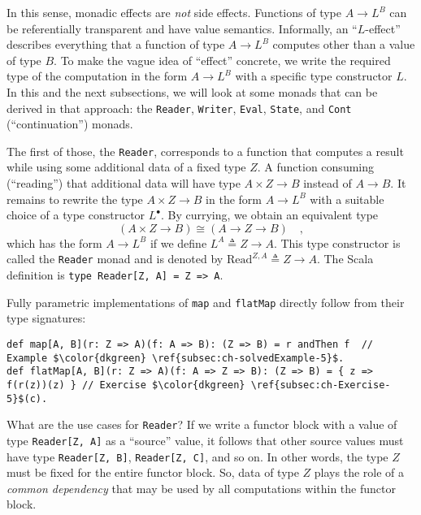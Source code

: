 In this sense, monadic effects are \emph{not} side effects.
Functions of type $A\rightarrow L^{B}$ can be referentially transparent
and have value semantics. Informally, an \textsf{``}$L$-effect\textsf{''}
describes everything that a function of type $A\rightarrow L^{B}$
computes other than a value of type $B$. To make the vague idea of
\textsf{``}effect\textsf{''} concrete, we write the required type of the computation
in the form $A\rightarrow L^{B}$ with a specific type constructor
$L$. In this and the next subsections, we will look at some monads
that can be derived in that approach: the \lstinline!Reader!, \lstinline!Writer!,
\lstinline!Eval!, \lstinline!State!, and \lstinline!Cont! (\textsf{``}continuation\textsf{''})
monads.

The first of those, the \lstinline!Reader!, corresponds to a function
that computes a result while using some additional data of a fixed
type $Z$. A function consuming (\textsf{``}reading\textsf{''}) that additional data
will have type $A\times Z\rightarrow B$ instead of $A\rightarrow B$.
It remains to rewrite the type $A\times Z\rightarrow B$ in the form
$A\rightarrow L^{B}$ with a suitable choice of a type constructor
$L^{\bullet}$. By currying, we obtain an equivalent type
\[
(A\times Z\rightarrow B)\cong(A\rightarrow Z\rightarrow B)\quad,
\]
which has the form $A\rightarrow L^{B}$ if we define $L^{A}\triangleq Z\rightarrow A$.
This type constructor is called the \lstinline!Reader! monad
and is denoted by $\text{Read}^{Z,A}\triangleq Z\rightarrow A$. The
Scala definition is \lstinline!type Reader[Z, A] = Z => A!.

Fully parametric implementations of \lstinline!map! and \lstinline!flatMap!
directly follow from their type signatures:
\begin{lstlisting}[mathescape=true]
def map[A, B](r: Z => A)(f: A => B): (Z => B) = r andThen f  // Example $\color{dkgreen} \ref{subsec:ch-solvedExample-5}$.
def flatMap[A, B](r: Z => A)(f: A => Z => B): (Z => B) = { z => f(r(z))(z) } // Exercise $\color{dkgreen} \ref{subsec:ch-Exercise-5}$(c).
\end{lstlisting}

What are the use cases for \lstinline!Reader!? If we write a functor
block with a value of type \lstinline!Reader[Z, A]! as a \textsf{``}source\textsf{''}
value, it follows that other source values must have type \lstinline!Reader[Z, B]!,
\lstinline!Reader[Z, C]!, and so on. In other words, the type $Z$
must be fixed for the entire functor block. So, data of type $Z$
plays the role of a \emph{common dependency} that may be used by all
computations within the functor block.

